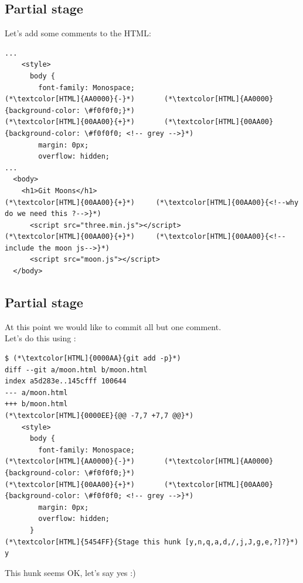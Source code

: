 \subsection{Partial stage}
\begin{frame}[fragile]
  \subslidetitle
  Let's add some comments to the HTML:

  \begin{lstlisting}
...
    <style>
      body {
        font-family: Monospace;
(*\textcolor[HTML]{AA0000}{-}*)       (*\textcolor[HTML]{AA0000}{background-color: \#f0f0f0;}*)
(*\textcolor[HTML]{00AA00}{+}*)       (*\textcolor[HTML]{00AA00}{background-color: \#f0f0f0; <!-- grey -->}*)
        margin: 0px;
        overflow: hidden;
...
  <body>
    <h1>Git Moons</h1>
(*\textcolor[HTML]{00AA00}{+}*)     (*\textcolor[HTML]{00AA00}{<!--why do we need this ?-->}*)
      <script src="three.min.js"></script>
(*\textcolor[HTML]{00AA00}{+}*)     (*\textcolor[HTML]{00AA00}{<!--include the moon js-->}*)
      <script src="moon.js"></script>
  </body>
\end{lstlisting}
\end{frame}

\subsection{Partial stage}
\begin{frame}[fragile]
  \subslidetitle
  At this point we would like to commit all but one comment.
  \\
  Let's do this using :
  \begin{lstlisting}
$ (*\textcolor[HTML]{0000AA}{git add -p}*)
diff --git a/moon.html b/moon.html
index a5d283e..145cfff 100644
--- a/moon.html
+++ b/moon.html
(*\textcolor[HTML]{0000EE}{@@ -7,7 +7,7 @@}*)
    <style>
      body {
        font-family: Monospace;
(*\textcolor[HTML]{AA0000}{-}*)       (*\textcolor[HTML]{AA0000}{background-color: \#f0f0f0;}*)
(*\textcolor[HTML]{00AA00}{+}*)       (*\textcolor[HTML]{00AA00}{background-color: \#f0f0f0; <!-- grey -->}*)
        margin: 0px;
        overflow: hidden;
      }
(*\textcolor[HTML]{5454FF}{Stage this hunk [y,n,q,a,d,/,j,J,g,e,?]?}*) y
\end{lstlisting}
  This hunk seems OK, let's say yes :)
\end{frame}

